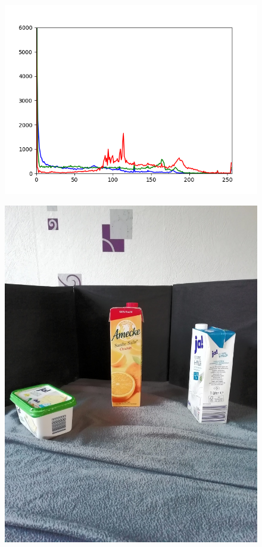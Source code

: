 \begin{appendices}
\begin{figure}[htb]
\begin{minipage}[c]{0.08\textwidth}
\end{minipage}
\hfill
\begin{minipage}[c]{0.3\textwidth}
\includegraphics[width=\textwidth]{Sources/Bild1_HA_histo.png}
\end{minipage}
\end{figure}
\begin{figure}[htb]
\begin{minipage}[c]{0.2\textwidth}
\includegraphics[width=\textwidth]{Sources/Bild2_HA.jpg}

\end{minipage}
\end{figure}
\end{appendices}
